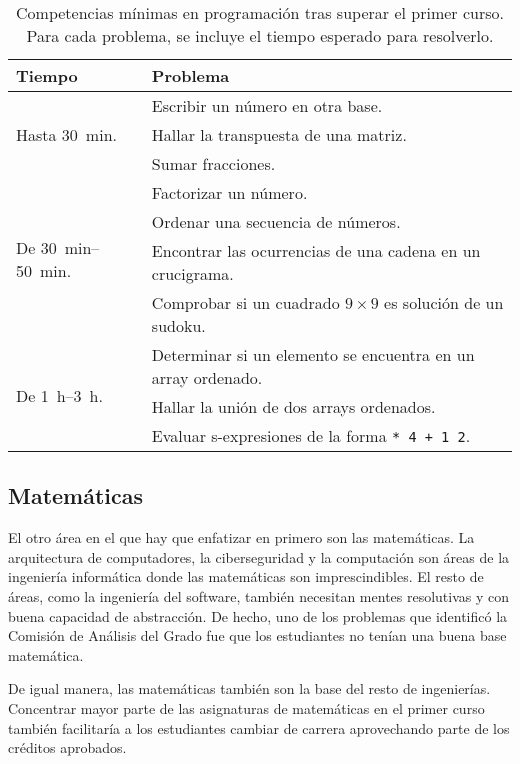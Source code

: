 \begin{table}[h]
    \centering
    \begin{tabular}{ll}
        \textbf{Tiempo} & \textbf{Problema} \\
        \hline
        \multirow{3}{*}{Hasta \SI{30}{min}.}
        & Escribir un número en otra base. \\
        & Hallar la transpuesta de una matriz. \\
        & Sumar fracciones. \\
        \hline
        \multirow{4}{*}{De \SIrange{30}{50}{min}.}
        & Factorizar un número. \\ 
        & Ordenar una secuencia de números. \\
        & Encontrar las ocurrencias de una cadena en un crucigrama. \\
        & Comprobar si un cuadrado $9\times 9$ es solución de un sudoku. \\
        \hline
        \multirow{3}{*}{De \SIrange{1}{3}{h}.}
        & Determinar si un elemento se encuentra en un array ordenado. \\
        & Hallar la unión de dos arrays ordenados. \\
        & Evaluar s-expresiones de la forma \lstinline!* 4 + 1 2!.
    \end{tabular}
    \caption{
        Competencias mínimas en programación tras superar el primer curso.
        Para cada problema, se incluye el tiempo esperado para resolverlo.
    }
    \label{tab:first-course-programming-examples}
\end{table}

\subsection{Matemáticas}

El otro área en el que hay que enfatizar en primero son las matemáticas.
La arquitectura de computadores, la ciberseguridad y la computación
son áreas de la ingeniería informática donde
las matemáticas son imprescindibles.
El resto de áreas, como la ingeniería del software,
también necesitan mentes resolutivas y con buena capacidad de abstracción.
De hecho, uno de los problemas que
identificó la Comisión de Análisis del Grado
fue que los estudiantes no tenían una buena base matemática.

De igual manera,
las matemáticas también son la base del resto de ingenierías.
Concentrar mayor parte de las asignaturas de matemáticas en el primer curso
también facilitaría a los estudiantes cambiar de carrera
aprovechando parte de los créditos aprobados.

